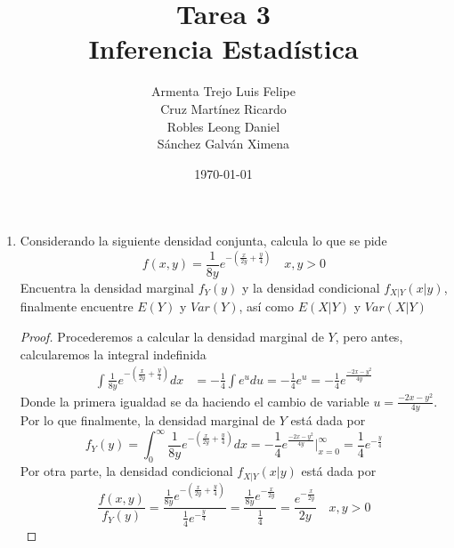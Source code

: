 \documentclass[10pt,a4paper]{article}
\theoremstyle{plain}
\theoremstyle{definition}
\theoremstyle{remark}
\newenvironment{solucion}{\renewcommand{\proofname}{Solución}\renewcommand{\qedsymbol}{}\begin{proof}}{\end{proof}}
\begin{document}
\title{Tarea 3\\Inferencia Estadística}
\date{\today}
\author{Armenta Trejo Luis Felipe \\ Cruz Martínez Ricardo\\ Robles Leong Daniel \\ Sánchez Galván Ximena}
\maketitle

\begin{enumerate}
    \item Considerando la siguiente densidad conjunta, calcula lo que se pide
    \begin{equation*}
        f(x,y) = \frac{1}{8y}e^{-(\frac{x}{2y} + \frac{y}{4})} \quad x,y > 0
    \end{equation*}
    Encuentra la densidad marginal $f_Y (y)$ y la densidad condicional $f_{X|Y}(x|y)$, finalmente encuentre $E(Y)$ y  $Var(Y)$, así como $E(X|Y)$ y $Var(X|Y)$
    \begin{solucion}
    Procederemos a calcular la densidad marginal de $Y$, pero antes, calcularemos la integral indefinida
    \begin{equation*}
        \begin{split}
            \int \frac{1}{8y}e^{-(\frac{x}{2y} + \frac{y}{4})} dx  & = -\frac{1}{4} \int e^{u} du = -\frac{1}{4} e^{u} = -\frac{1}{4} e^{\frac{-2x-y^2}{4y}}
        \end{split}
    \end{equation*}
    Donde la primera igualdad se da haciendo el cambio de variable $u = \frac{-2x-y^2}{4y}$.\\
    Por lo que finalmente, la densidad marginal de $Y$ está dada por 
    \begin{equation*}
        f_Y (y) = \int_{0}^{\infty} \frac{1}{8y}e^{-(\frac{x}{2y} + \frac{y}{4})} dx = -\frac{1}{4} e^{\frac{-2x-y^2}{4y}}\vert_{x = 0}^{\infty} = \frac{1}{4} e^{-\frac{y}{4}}
    \end{equation*}
    Por otra parte, la densidad condicional $f_{X|Y}(x|y)$ está dada por
    \begin{equation*}
        \frac{f(x,y)}{f_Y (y)} = \frac{\frac{1}{8y}e^{-(\frac{x}{2y} + \frac{y}{4})}}{\frac{1}{4} e^{-\frac{y}{4}}} = \frac{\frac{1}{8y}e^{-\frac{x}{2y}}}{\frac{1}{4}} = \frac{e^{-\frac{x}{2y}}}{2y} \quad x,y > 0
    \end{equation*}

\end{solucion}
\end{enumerate}
\end{document}
